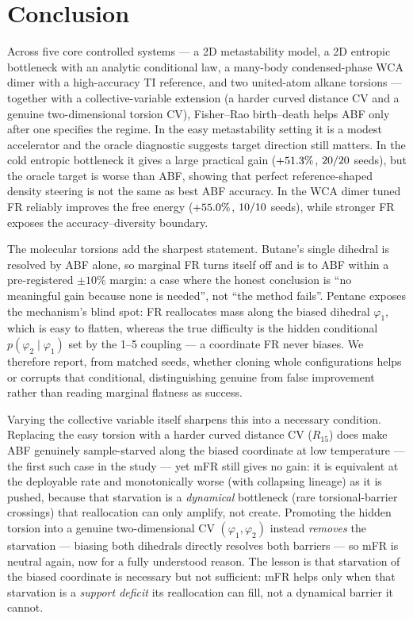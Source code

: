 \section{Conclusion}
\label{sec:conclusion}

Across five core controlled systems --- a 2D metastability model, a 2D entropic
bottleneck with an analytic conditional law, a many-body condensed-phase WCA dimer
with a high-accuracy TI reference, and two united-atom alkane torsions --- together with a
collective-variable extension (a harder curved distance CV and a genuine two-dimensional
torsion CV), Fisher--Rao birth--death helps ABF only after one specifies the regime. In the easy metastability
setting it is a modest accelerator and the oracle diagnostic suggests target direction
still matters. In the cold entropic bottleneck it gives a large practical gain
($+51.3\%$, $20/20$ seeds), but the oracle target is worse than
ABF, showing that perfect reference-shaped density steering is not the same as
best ABF accuracy. In the WCA dimer tuned FR reliably improves the free energy
($+55.0\%$, $10/10$ seeds), while stronger FR exposes the
accuracy--diversity boundary.

The molecular torsions add the sharpest statement. Butane's single dihedral is
resolved by ABF alone, so marginal FR turns itself off and is
\textbf{\AlkButaneVerdict} to ABF within a pre-registered $\pm10\%$ margin: a case
where the honest conclusion is ``no meaningful gain because none is needed'', not
``the method fails''. Pentane exposes the mechanism's blind spot: FR reallocates mass
along the biased dihedral $\varphi_1$, which is easy to flatten, whereas the true
difficulty is the hidden conditional $p(\varphi_2\mid\varphi_1)$ set by the 1--5
coupling --- a coordinate FR never biases. We therefore report, from matched seeds,
whether cloning whole configurations helps or corrupts that conditional, distinguishing
genuine from false improvement rather than reading marginal flatness as success.

Varying the collective variable itself sharpens this into a necessary condition.
Replacing the easy torsion with a harder curved distance CV ($R_{15}$) does make ABF
genuinely sample-starved along the biased coordinate at low temperature --- the first such
case in the study --- yet mFR still gives no gain: it is equivalent at the deployable rate
and monotonically worse (with collapsing lineage) as it is pushed, because that starvation is
a \emph{dynamical} bottleneck (rare torsional-barrier crossings) that reallocation can only
amplify, not create. Promoting the hidden torsion into a genuine two-dimensional CV
$(\varphi_1,\varphi_2)$ instead \emph{removes} the starvation --- biasing both dihedrals
directly resolves both barriers --- so mFR is neutral again, now for a fully understood
reason. The lesson is that starvation of the biased coordinate is necessary but not
sufficient: mFR helps only when that starvation is a \emph{support deficit} its reallocation
can fill, not a dynamical barrier it cannot.

